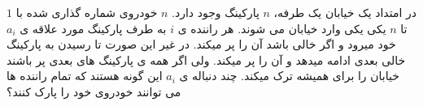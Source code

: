 \exercise
در امتداد یک خیابان یک طرفه، 
$n$
 پارکینگ وجود دارد. 
$n$
خودروی شماره گذاری شده با 
$1$
 تا
$n$
یکی یکی وارد خیابان می شوند. هر راننده ی
$i$
 به طرف پارکینگ مورد علاقه ی
$a_i$
خود میرود و اگر خالی باشد آن را پر میکند. در غیر این صورت تا رسیدن به پارکینگ خالی بعدی ادامه میدهد و آن را پر میکند. ولی اگر همه ی پارکینگ های بعدی پر باشند خیابان را برای همیشه ترک میکند. چند دنباله ی
$a_i$
این گونه هستند که تمام راننده ها می توانند خودروی خود را پارک کنند؟